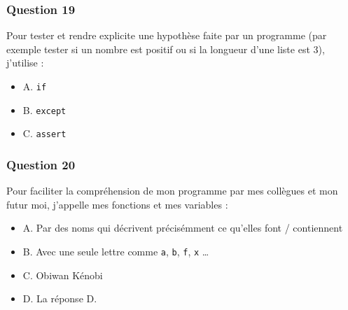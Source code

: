 \documentclass[
]{article}
\providecommand{\tightlist}{%
  \setlength{\itemsep}{0pt}\setlength{\parskip}{0pt}}
\begin{document}
\hypertarget{question-19}{%
\subsubsection{Question 19}\label{question-19}}

Pour tester et rendre explicite une hypothèse faite par un programme
(par exemple tester si un nombre est positif ou si la longueur d'une
liste est 3), j'utilise :

\begin{itemize}
\tightlist
\item
  A. \texttt{if}
\item
  B. \texttt{except}
\item
  C. \texttt{assert}
\end{itemize}

\hypertarget{question-20}{%
\subsubsection{Question 20}\label{question-20}}

Pour faciliter la compréhension de mon programme par mes collègues et
mon futur moi, j'appelle mes fonctions et mes variables :

\begin{itemize}
\tightlist
\item
  A. Par des noms qui décrivent précisémment ce qu'elles font /
  contiennent
\item
  B. Avec une seule lettre comme \texttt{a}, \texttt{b}, \texttt{f},
  \texttt{x} \ldots{}
\item
  C. Obiwan Kénobi
\item
  D. La réponse D.
\end{itemize}
\end{document}
